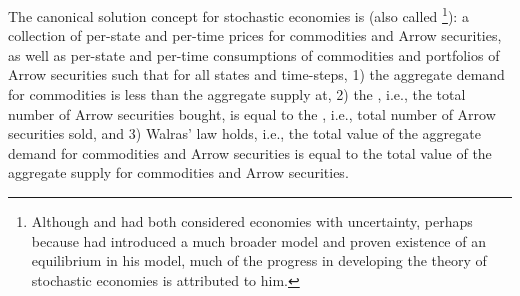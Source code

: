 

The canonical solution concept for stochastic economies is  (also called %
\footnote{Although \citet{arrow1964role, radner1972sequentualeqm} and \citet{diamond1967incompletege} had both considered economies with uncertainty, perhaps because \citet{radner1972sequentualeqm} had introduced a much broader model and proven existence of an equilibrium in his model, much of the progress in developing the theory of stochastic economies is attributed to him.}): a collection of per-state and per-time prices for commodities and Arrow securities, as well as per-state and per-time consumptions of commodities and portfolios of Arrow securities such that for all states and time-steps, 1) the aggregate demand for commodities is less than the aggregate supply at, 2) the , i.e., the total number of Arrow securities bought, is equal to  the , i.e., total number of Arrow securities sold, and 3) Walras' law holds, i.e., the total value of the aggregate demand for commodities and Arrow securities is equal to the total value of the aggregate supply for commodities and Arrow securities.
\fi




